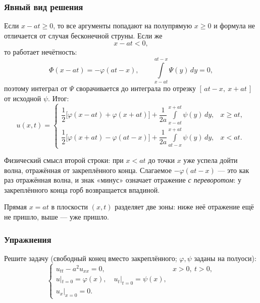 \subsubsection*{Явный вид решения}

Если $x - at \ge 0$, то все аргументы попадают на полупрямую $x\ge 0$ и формула
не отличается от случая бесконечной струны. Если же
\[
  x - at < 0,
\]
то работает нечётность:
\[
  \Phi(x-at) = -\varphi(at-x),
  \qquad
  \int\limits_{x-at}^{at-x} \Psi(y)\, dy = 0 ,
\]
поэтому интеграл от $\Psi$ сворачивается до интеграла по отрезку
$[\,at-x,\ x+at\,]$ от исходной $\psi$. Итог:
\[
  \boxed{\
  u(x,t) =
  \begin{cases}
    \dfrac12\Big[\varphi(x-at) + \varphi(x+at)\Big]
      + \dfrac{1}{2a} \displaystyle\int\limits_{x-at}^{x+at} \psi(y)\, dy,
      & x \ge at, \\[18pt]
    \dfrac12\Big[\varphi(x+at) - \varphi(at-x)\Big]
      + \dfrac{1}{2a} \displaystyle\int\limits_{at-x}^{x+at} \psi(y)\, dy,
      & x < at .
  \end{cases}\ }
\]

\begin{idea}
Физический смысл второй строки: при $x < at$ до точки $x$ уже успела дойти волна,
отражённая от закреплённого конца. Слагаемое $-\varphi(at-x)$ — это как раз
отражённая волна, и знак «минус» означает отражение \emph{с переворотом}: у
закреплённого конца горб возвращается впадиной.

\medskip
Прямая $x = at$ в плоскости $(x,t)$ разделяет две зоны: ниже неё отражение ещё не
пришло, выше — уже пришло.
\end{idea}

\subsubsection*{Упражнения}

\begin{exercise}
Решите задачу (свободный конец вместо закреплённого; $\varphi, \psi$ заданы на
полуоси):
\begin{equation}\tag{2}\label{eq:semi-neumann}
  \begin{cases}
    u_{tt} - a^2 u_{xx} = 0, & x > 0,\ t > 0, \\[2pt]
    u|_{t=0} = \varphi(x), \quad u_t|_{t=0} = \psi(x), \\[2pt]
    u_x|_{x=0} = 0 .
  \end{cases}
\end{equation}
\end{exercise}


